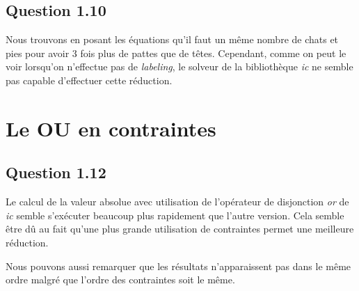\documentclass[a4paper,12pt]{article}
\begin{document}
\subsection*{Question 1.10}
Nous trouvons en posant les équations qu'il faut un même nombre de chats et pies pour avoir 3 fois plus de pattes que de têtes.
Cependant, comme on peut le voir lorsqu'on n'effectue pas de \textit{labeling}, le solveur de la bibliothèque \textit{ic} ne semble pas capable d'effectuer cette réduction.


\section{Le OU en contraintes}


\vspace{2cm}

\subsection*{Question 1.12}
Le calcul de la valeur absolue avec utilisation de l'opérateur de disjonction \textit{or} de \textit{ic} semble s'exécuter beaucoup plus rapidement que l'autre version. Cela semble être dû au fait qu'une plus grande utilisation de contraintes permet une meilleure réduction.

Nous pouvons aussi remarquer que les résultats n'apparaissent pas dans le même ordre malgré que l'ordre des contraintes soit le même.
\end{document}
